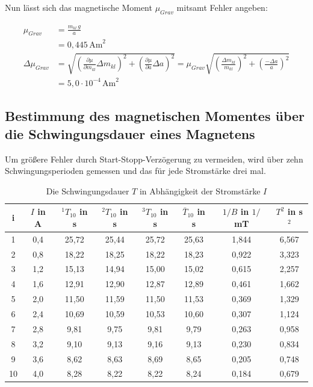 Nun lässt sich das magnetische Moment $\mu_{Grav}$ mitsamt Fehler angeben:

\begin{align}
 \nonumber
 \mu_{Grav} &= \frac{m_{kl}\,g}{a} \\
 &= 0,445\, \text{Am}^2\\
 \nonumber
 \Delta \mu_{Grav} &= \sqrt{\left(\frac{\partial \mu}{\partial m_{kl}}\Delta m_{kl} \right)^2 + \left(\frac{\partial \mu}{\partial a}\Delta a \right)^2} = \mu_{Grav} \sqrt{\left( \frac{\Delta m_{kl}}{m_{kl}}\right)^2 + \left( \frac{-\Delta a}{a}\right)^2}\\
 &= 5,0 \cdot 10^{-4}\, \text{Am}^2
\end{align}

\subsection[Ermittlung durch Schwingungsdauer]{Bestimmung des magnetischen Momentes über die Schwingungsdauer eines Magnetens}
Um größere Fehler durch Start-Stopp-Verzögerung zu vermeiden, wird über zehn Schwingungsperioden gemessen und das für jede Stromstärke
drei mal. 

 \begin{table}[H]
  \begin{tabular}{c|c|c|c|c|c|c|c}
i & $I$ in A & $^1T_{10}$ in s & $^2T_{10}$ in s & $^3T_{10}$ in s & $\bar T_{10}$ in s & $ 1/B$ in $1/$mT & $T^2$ in s$^2$\\
  \hline
1&	0,4&	25,72&	25,44&	25,72&	25,63&	1,844&	6,567\\
2&	0,8&	18,22&	18,25&	18,22&	18,23&	0,922&	3,323\\
3&	1,2&	15,13&	14,94&	15,00&	15,02&	0,615&	2,257\\
4&	1,6&	12,91&	12,90&	12,87&	12,89&	0,461&	1,662\\
5&	2,0&	11,50&	11,59&	11,50&	11,53&	0,369&	1,329\\
6&	2,4&	10,69&	10,59&	10,53&	10,60&	0,307&	1,124\\
7&	2,8&	9,81&	9,75&	9,81&	9,79&	0,263&	0,958\\
8&	3,2&	9,10&	9,13&	9,16&	9,13&	0,230&	0,834\\
9&	3,6&	8,62&	8,63&	8,69&	8,65&	0,205&	0,748\\
10&	4,0&	8,28&	8,22&	8,22&	8,24&	0,184&	0,679    
  \end{tabular}
\caption{Die Schwingungsdauer $T$ in Abhängigkeit der Stromstärke $I$}
  \label{tabschwing}
 \end{table}

